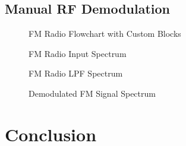 \documentclass{article}
\begin{document}
\subsection{Manual RF Demodulation}

\begin{figure}[H]
	\centerline{}
	\caption{FM Radio Flowchart with Custom Blocks}
	\label{fig::fm_radio_user_flowchart}
\end{figure}

\begin{figure}[H]
	\centerline{}
	\caption{FM Radio Input Spectrum}
	\label{fig::fm_radio_user_input_spectrum}
\end{figure}

\begin{figure}[H]
	\centerline{}
	\caption{FM Radio LPF Spectrum}
	\label{fig::fm_radio_user_lpf_spectrum}
\end{figure}

\begin{figure}[H]
	\centerline{}
	\caption{Demodulated FM Signal Spectrum}
	\label{fig::fm_radio_user_demod_spectrum}
\end{figure}

\section{Conclusion}

%
%
	
\end{document}
